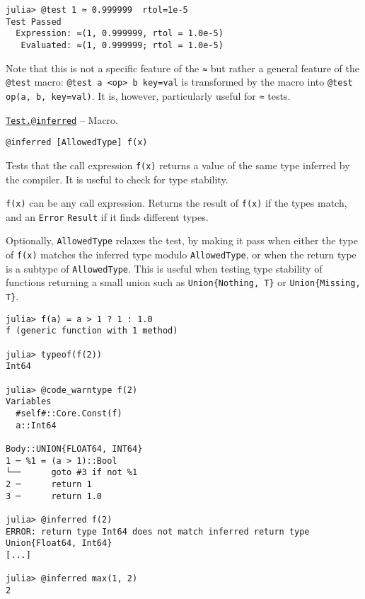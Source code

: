 \begin{verbatim}
julia> @test 1 ≈ 0.999999  rtol=1e-5
Test Passed
  Expression: ≈(1, 0.999999, rtol = 1.0e-5)
   Evaluated: ≈(1, 0.999999; rtol = 1.0e-5)
\end{verbatim}



Note that this is not a specific feature of the \texttt{≈} but rather a general feature of the \texttt{@test} macro: \texttt{@test a <op> b key=val} is transformed by the macro into \texttt{@test op(a, b, key=val)}. It is, however, particularly useful for \texttt{≈} tests.


\hypertarget{14660196658788499514}{}
\hyperlink{14660196658788499514}{\texttt{Test.@inferred}}  -- {Macro.}

\begin{adjustwidth}{2em}{0pt}


\begin{verbatim}
@inferred [AllowedType] f(x)
\end{verbatim}

Tests that the call expression \texttt{f(x)} returns a value of the same type inferred by the compiler. It is useful to check for type stability.

\texttt{f(x)} can be any call expression. Returns the result of \texttt{f(x)} if the types match, and an \texttt{Error} \texttt{Result} if it finds different types.

Optionally, \texttt{AllowedType} relaxes the test, by making it pass when either the type of \texttt{f(x)} matches the inferred type modulo \texttt{AllowedType}, or when the return type is a subtype of \texttt{AllowedType}. This is useful when testing type stability of functions returning a small union such as \texttt{Union\{Nothing, T\}} or \texttt{Union\{Missing, T\}}.


\begin{verbatim}
julia> f(a) = a > 1 ? 1 : 1.0
f (generic function with 1 method)

julia> typeof(f(2))
Int64

julia> @code_warntype f(2)
Variables
  #self#::Core.Const(f)
  a::Int64

Body::UNION{FLOAT64, INT64}
1 ─ %1 = (a > 1)::Bool
└──      goto #3 if not %1
2 ─      return 1
3 ─      return 1.0

julia> @inferred f(2)
ERROR: return type Int64 does not match inferred return type Union{Float64, Int64}
[...]

julia> @inferred max(1, 2)
2


\end{verbatim}
\end{adjustwidth}

